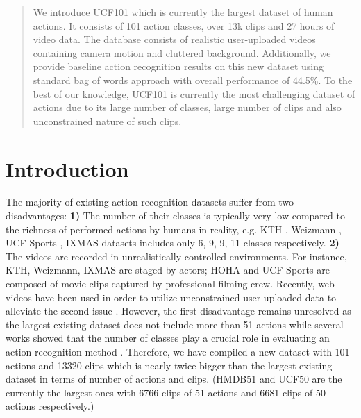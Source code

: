 \documentclass[10pt,twocolumn,letterpaper]{article}
\begin{document}
\maketitle


\begin{abstract}
We introduce UCF101 which is currently the largest dataset of human actions.
It consists of 101 action classes, over 13k clips and 27 hours of video data.
The database consists of realistic user-uploaded videos containing camera motion and cluttered background.
Additionally, we provide baseline action recognition results on this new dataset using standard bag of words approach with overall performance of 44.5\%.
To the best of our knowledge, UCF101 is currently the most challenging dataset of actions due to its large number of classes, large number of clips and also unconstrained nature of such clips.
\end{abstract}







\section{Introduction}

The majority of existing action recognition datasets suffer from two disadvantages: \textbf{1)} The number of their classes is typically very low compared to the richness of performed actions by humans in reality, e.g. KTH \cite{KTH}, Weizmann \cite{Weizmann}, UCF Sports \cite{UCFSports}, IXMAS \cite{IXMAS} datasets includes only 6, 9, 9, 11 classes respectively. \textbf{2)} The videos are recorded in unrealistically controlled environments. For instance, KTH, Weizmann, IXMAS are staged by actors; HOHA \cite{HOHA} and UCF Sports are composed of movie clips captured by professional filming crew. Recently, web videos have been used in order to utilize unconstrained user-uploaded data to alleviate the second issue \cite{UCF11,Olympic,UCF50,HMDB51}. However, the first disadvantage remains unresolved as the largest existing dataset does not include more than 51 actions while several works showed that the number of classes play a crucial role in evaluating an action recognition method \cite{Johansson,UCF50}. Therefore, we have compiled a new dataset with 101 actions and 13320 clips which is nearly twice bigger than the largest existing dataset in terms of number of actions and clips. (HMDB51 \cite{HMDB51} and UCF50 \cite{UCF50} are the currently the largest ones with 6766 clips of 51 actions and 6681 clips of 50 actions respectively.)
\end{document}
